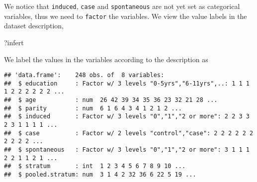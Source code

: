 \documentclass[]{book}
\newenvironment{Shaded}{\begin{snugshade}}{\end{snugshade}}
\newcommand{\KeywordTok}[1]{\textcolor[rgb]{0.13,0.29,0.53}{\textbf{#1}}}
\newcommand{\DataTypeTok}[1]{\textcolor[rgb]{0.13,0.29,0.53}{#1}}
\newcommand{\DecValTok}[1]{\textcolor[rgb]{0.00,0.00,0.81}{#1}}
\newcommand{\StringTok}[1]{\textcolor[rgb]{0.31,0.60,0.02}{#1}}
\newcommand{\OperatorTok}[1]{\textcolor[rgb]{0.81,0.36,0.00}{\textbf{#1}}}
\newcommand{\NormalTok}[1]{#1}
\theoremstyle{definition}
\theoremstyle{definition}
\theoremstyle{remark}
\begin{document}
We notice that \texttt{induced}, \texttt{case} and \texttt{spontaneous}
are not yet set as categorical variables, thus we need to
\texttt{factor} the variables. We view the value labels in the dataset
description,

\begin{Shaded}
\begin{Highlighting}[]
\NormalTok{?infert}
\end{Highlighting}
\end{Shaded}

We label the values in the variables according to the description as

\begin{Shaded}
\end{Shaded}

\begin{verbatim}
## 'data.frame':    248 obs. of  8 variables:
##  $ education     : Factor w/ 3 levels "0-5yrs","6-11yrs",..: 1 1 1 1 2 2 2 2 2 2 ...
##  $ age           : num  26 42 39 34 35 36 23 32 21 28 ...
##  $ parity        : num  6 1 6 4 3 4 1 2 1 2 ...
##  $ induced       : Factor w/ 3 levels "0","1","2 or more": 2 2 3 3 2 3 1 1 1 1 ...
##  $ case          : Factor w/ 2 levels "control","case": 2 2 2 2 2 2 2 2 2 2 ...
##  $ spontaneous   : Factor w/ 3 levels "0","1","2 or more": 3 1 1 1 2 2 1 1 2 1 ...
##  $ stratum       : int  1 2 3 4 5 6 7 8 9 10 ...
##  $ pooled.stratum: num  3 1 4 2 32 36 6 22 5 19 ...
\end{verbatim}
\end{document}
